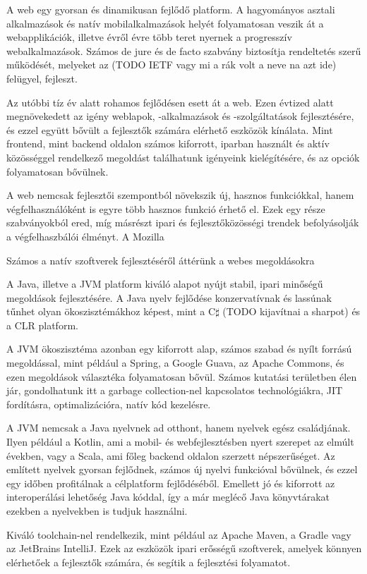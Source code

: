 A web egy gyorsan és dinamikusan fejlődő platform. A hagyományos asztali alkalmazások és natív mobilalkalmazások helyét folyamatosan veszik át a webapplikációk, illetve évről évre több teret nyernek a progresszív webalkalmazások. Számos de jure és de facto szabvány biztosítja rendeltetés szerű működését, melyeket az (TODO IETF vagy mi a rák volt a neve na azt ide) felügyel, fejleszt. \newline

Az utóbbi tíz év alatt rohamos fejlődésen esett át a web. Ezen évtized alatt megnövekedett az igény weblapok, -alkalmazások és -szolgáltatások fejlesztésére, és ezzel együtt bővült a fejlesztők számára elérhető eszközök kínálata. Mint frontend, mint backend oldalon számos kiforrott, iparban használt és aktív közösséggel rendelkező megoldást találhatunk igényeink kielégítésére, és az opciók folyamatosan bővülnek. \newline

A web nemcsak fejlesztői szempontból növekszik új, hasznos funkciókkal, hanem végfelhasználóként is egyre több hasznos funkció érhető el. Ezek egy része szabványokból ered, míg másrészt ipari és fejlesztőközösségi trendek befolyásolják a végfelhaszbálói élményt. A Mozilla \newline

Számos a natív szoftverek fejlesztéséről áttérünk a webes megoldásokra \newline

A Java, illetve a JVM platform kiváló alapot nyújt stabil, ipari minőségű megoldások fejlesztésére. A Java nyelv fejlődése konzervatívnak és lassúnak tűnhet olyan ökoszisztémákhoz képest, mint a C$\sharp$ (TODO kijavítnai a sharpot)  és a CLR platform. \newline

A JVM ökoszisztéma azonban egy kiforrott alap, számos szabad és nyílt forrású megoldással, mint például a Spring, a Google Guava, az Apache Commons, és ezen megoldások választéka folyamatosan bővül. Számos kutatási területben élen jár, gondolhatunk itt a garbage collection-nel kapcsolatos technológiákra, JIT fordításra, optimalizációra, natív kód kezelésre.
\newline

A JVM nemcsak a Java nyelvnek ad otthont, hanem nyelvek egész családjának. Ilyen például a Kotlin, ami a mobil- és webfejlesztésben nyert szerepet az elmúlt években, vagy a Scala, ami főleg backend oldalon szerzett népszerűséget. Az említett nyelvek gyorsan fejlődnek, számos új nyelvi funkcióval bővülnek, és ezzel egy időben profitálnak a célplatform fejlődéséből. Emellett jó és kiforrott az interoperálási lehetőség Java kóddal, így a már meglécő Java könyvtárakat ezekben a nyelvekben is tudjuk használni. \newline

Kiváló toolchain-nel rendelkezik, mint például az Apache Maven, a Gradle vagy az JetBrains IntelliJ. Ezek az eszközök ipari erősségű szoftverek, amelyek könnyen elérhetőek a fejlesztők számára, és segítik a fejlesztési folyamatot.
